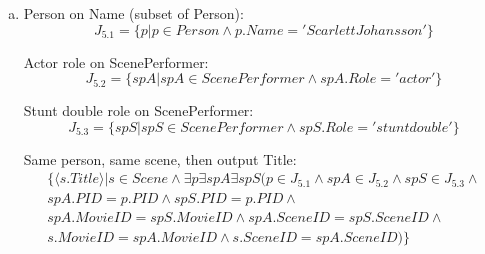 \documentclass{article}
\begin{document}
\begin{enumerate}[(a)]
\item
Person on Name (subset of Person):
\begin{equation}
J_{5.1} = \{ p | p \in Person \land p.Name='Scarlett Johansson' \}
\end{equation}

Actor role on ScenePerformer:
\begin{equation}
J_{5.2} = \{ spA | spA \in ScenePerformer \land spA.Role='actor' \}
\end{equation}

Stunt double role on ScenePerformer:
\begin{equation}
J_{5.3} = \{ spS | spS \in ScenePerformer \land spS.Role='stunt double' \}
\end{equation}

Same person, same scene, then output Title:
\begin{multline}
\{ \langle s.Title \rangle | s \in Scene \land \exists p\exists spA\exists spS(p \in J_{5.1} \land spA \in J_{5.2} \land spS \in J_{5.3} \land {}\\
 spA.PID=p.PID \land spS.PID=p.PID \land \\
 spA.MovieID=spS.MovieID \land spA.SceneID=spS.SceneID \land\\
 s.MovieID=spA.MovieID \land s.SceneID=spA.SceneID ) \}
\end{multline}


\end{enumerate}
\end{document}
